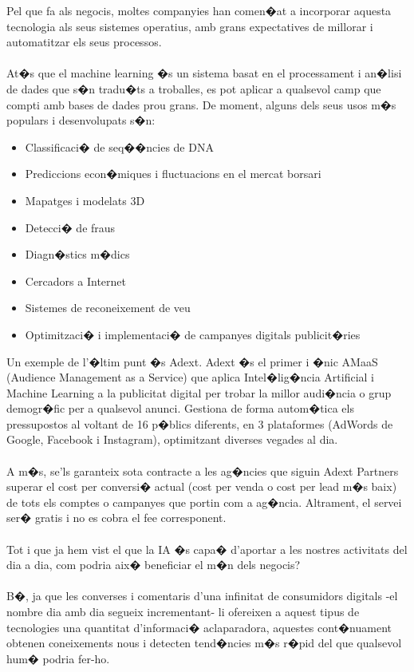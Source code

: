 \documentclass[12pt,a4paper,openright,oneside]{article}
\numberwithin{equation}{section}
\theoremstyle{definition}
\begin{document}
Pel que fa als negocis, moltes companyies han comen�at a incorporar aquesta tecnologia als seus sistemes operatius, amb grans expectatives de millorar i automatitzar els seus processos.
\\\\
At�s que el machine learning �s un sistema basat en el processament i an�lisi de dades que s�n tradu�ts a troballes, es pot aplicar a qualsevol camp que compti amb bases de dades prou grans. De moment, alguns dels seus usos m�s populars i desenvolupats s�n:
\begin{itemize}
\item Classificaci� de seq��ncies de DNA
\item Prediccions econ�miques i fluctuacions en el mercat borsari
\item Mapatges i modelats 3D
\item Detecci� de fraus
\item Diagn�stics m�dics
\item Cercadors a Internet
\item Sistemes de reconeixement de veu
\item Optimitzaci� i implementaci� de campanyes digitals publicit�ries
\end{itemize}
Un exemple de l'�ltim punt �s Adext. Adext �s el primer i �nic AMaaS (Audience Management as a Service) que aplica Intel�lig�ncia Artificial i Machine Learning a la publicitat digital per trobar la millor audi�ncia o grup demogr�fic per a qualsevol anunci. Gestiona de forma autom�tica els pressupostos al voltant de 16 p�blics diferents, en 3 plataformes (AdWords de Google, Facebook i Instagram), optimitzant diverses vegades al dia.\\\\
A m�s, se'ls garanteix sota contracte a les ag�ncies que siguin Adext Partners superar el cost per conversi� actual (cost per venda o cost per lead m�s baix) de tots els comptes o campanyes que portin com a ag�ncia. Altrament, el servei ser� gratis i no es cobra el fee corresponent.
\\\\
Tot i que ja hem vist el que la IA �s capa� d'aportar a les nostres activitats del dia a dia, com podria aix� beneficiar el m�n dels negocis?
\\\\
B�, ja que les converses i comentaris d'una infinitat de consumidors digitals -el nombre dia amb dia segueix incrementant- li ofereixen a aquest tipus de tecnologies una quantitat d'informaci� aclaparadora, aquestes cont�nuament obtenen coneixements nous i detecten tend�ncies m�s r�pid del que qualsevol hum� podria fer-ho.
\end{document}
